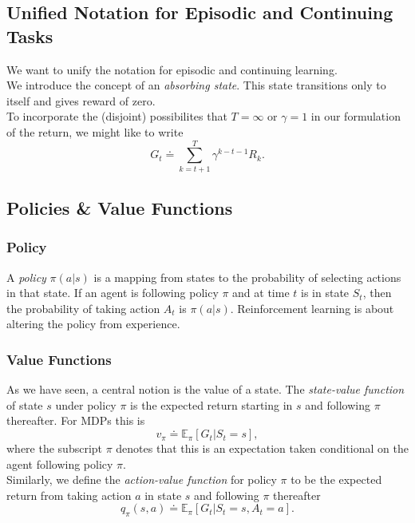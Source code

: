 \documentclass[a4paper, oneside, 11pt]{article}
\newcommand\Epi{\mathbb{E}_\pi}
\begin{document}
\subsection{Unified Notation for Episodic and Continuing Tasks}
We want to unify the notation for episodic and continuing learning. \\

We introduce the concept of an \emph{absorbing state}. This state transitions only to itself and gives reward of zero.\\

To incorporate the (disjoint) possibilites that $T=\infty$ or $\gamma = 1$ in our formulation of the return, we might like to write
\begin{equation}
    G_t \doteq \sum_{k=t+1}^T \gamma^{k-t-1}R_k.
\end{equation}


\subsection{Policies \& Value Functions}
\subsubsection*{Policy}
A \emph{policy} $\pi(a|s)$ is a mapping from states to the probability of selecting actions in that state. If an agent is following policy $\pi$ and at time $t$ is in state $S_t$, then the probability of taking action $A_t$ is $\pi(a|s)$. Reinforcement learning is about altering the policy from experience.\\

\subsubsection*{Value Functions}
As we have seen, a central notion is the value of a state. The \emph{state-value function} of state $s$ under policy $\pi$ is the expected return starting in $s$ and following $\pi$ thereafter. For MDPs this is
\begin{equation}
    v_\pi \doteq \Epi[G_t | S_t = s],
\end{equation}
where the subscript $\pi$ denotes that this is an expectation taken conditional on the agent following policy $\pi$. \\

Similarly, we define the \emph{action-value function} for policy $\pi$ to be the expected return from taking action $a$ in state $s$ and following $\pi$ thereafter
\begin{equation}
    q_\pi(s, a) \doteq \Epi[G_t | S_t = s, A_t = a].
\end{equation}
\end{document}
